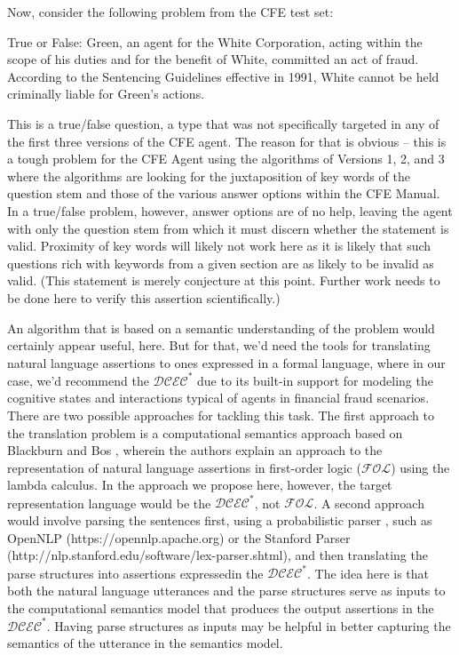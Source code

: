 Now, consider the following problem from the CFE test set:

True or False: Green, an agent for the White Corporation, acting within the scope of his duties and for the benefit of White, committed an act of fraud. According to the Sentencing Guidelines effective in 1991, White cannot be held criminally liable for Green’s actions.

This is a true/false question, a type that was not specifically targeted in any of the first three versions of the CFE agent. The reason for that is obvious – this is a tough problem for the CFE Agent using the algorithms of Versions 1, 2, and 3 where the algorithms are looking for the juxtaposition of key words of the question stem and those of the various answer options within the CFE Manual. In a true/false problem, however, answer options are of no help, leaving the agent with only the question stem from which it must discern whether the statement is valid.  Proximity of key words will likely not work here as it is likely that such questions rich with keywords from a given section are as likely to be invalid as valid. (This statement is merely conjecture at this point. Further work needs to be done here to verify this assertion scientifically.)

An algorithm that is based on a semantic understanding of the problem would certainly appear useful, here. But for that, we'd need the tools for translating natural language assertions to ones expressed in a formal language, where in our case, we'd recommend the $\mathcal{DCEC}^\ast$ due to its built-in support for modeling the cognitive states and interactions typical of agents in financial fraud scenarios. There are two possible approaches for tackling this task. The first approach to the translation problem is a computational semantics approach based on Blackburn and Bos \cite{blackburn2005representation}, wherein the authors explain an approach to the representation of natural language assertions in first-order logic ($\mathcal{FOL}$) using the lambda calculus. In the approach we propose here, however, the target representation language would be the $\mathcal{DCEC}^\ast$, not $\mathcal{FOL}$.  A second approach would involve parsing the sentences first, using a probabilistic parser \cite{martin2000speech}, such as OpenNLP (https://opennlp.apache.org) or the Stanford Parser (http://nlp.stanford.edu/software/lex-parser.shtml),  and then translating the parse structures into assertions expressedin the $\mathcal{DCEC}^\ast$.  The idea here is that both the natural language utterances and the parse structures serve as inputs to the computational semantics \cite{blackburn2005representation} model that produces the output assertions in the $\mathcal{DCEC}^\ast$.  Having parse structures as inputs may be helpful in better capturing the semantics of the utterance in the semantics model. 

